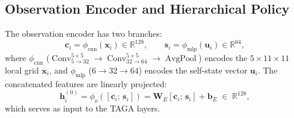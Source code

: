 \subsection{Observation Encoder and Hierarchical Policy}
\label{sec:encoder_policy}

The observation encoder has two branches:
\begin{equation}
  \mathbf{c}_i = \phi_{\text{cnn}}(\mathbf{x}_i) \in \mathbb{R}^{128},\qquad
  \mathbf{s}_i = \phi_{\text{mlp}}(\mathbf{u}_i) \in \mathbb{R}^{64},
  \label{eq:enc_branch}
\end{equation}
where $\phi_{\text{cnn}}$
($\operatorname{Conv}_{5\to32}^{5\times5} \!\to\!
\operatorname{Conv}_{32\to64}^{5\times5} \!\to\!
\operatorname{AvgPool}$) encodes the
$5\!\times\!11\!\times\!11$ local grid $\mathbf{x}_i$, and
$\phi_{\text{mlp}}$ ($6 \!\to\! 32 \!\to\! 64$) encodes the self-state
vector $\mathbf{u}_i$.  The concatenated features are linearly projected:
\begin{equation}
  \mathbf{h}_i^{(0)} = \phi_o([\mathbf{c}_i;\, \mathbf{s}_i])
  = \mathbf{W}_E [\mathbf{c}_i;\, \mathbf{s}_i] + \mathbf{b}_E
  \;\in\; \mathbb{R}^{128},
  \label{eq:enc_proj}
\end{equation}
which serves as input to the TAGA layers.

